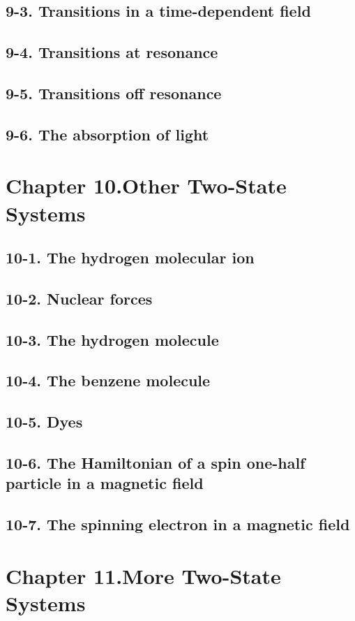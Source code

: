 \documentclass{article}
\begin{document}
\subsection{9-3. Transitions in a time-dependent field}
\subsection{9-4. Transitions at resonance}
\subsection{9-5. Transitions off resonance}
\subsection{9-6. The absorption of light}
\section{Chapter 10.Other Two-State Systems}
\subsection{10-1. The hydrogen molecular ion}
\subsection{10-2. Nuclear forces}
\subsection{10-3. The hydrogen molecule}
\subsection{10-4. The benzene molecule}
\subsection{10-5. Dyes}
\subsection{10-6. The Hamiltonian of a spin one-half particle in a magnetic field}
\subsection{10-7. The spinning electron in a magnetic field}
\section{Chapter 11.More Two-State Systems}
\end{document}
